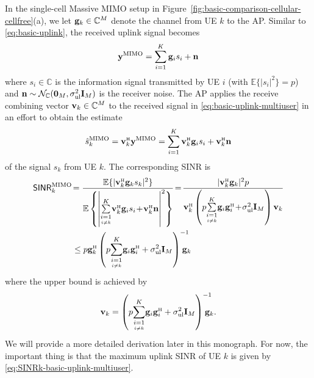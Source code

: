 In the single-cell Massive \gls{MIMO} setup in Figure~\ref{fig:basic-comparison-cellular-cellfree}(a), we let $\mathbf{g}_k \in \mathbb{C}^M$ denote the channel from \gls{UE} $k$ to the \gls{AP}. Similar to \eqref{eq:basic-uplink}, the received uplink signal becomes
\begin{equation} \label{eq:basic-uplink-multiuser}
\mathbf{y}^{\textrm{MIMO}} = \sum_{i=1}^{K} \mathbf{g}_i s_i + \mathbf{n}
\end{equation}
where $s_i \in \mathbb{C}$ is the information signal transmitted by \gls{UE} $i$ (with $\mathbb{E}\{ | s_i|^2 \} = p$) and $\mathbf{n} \sim \mathcal{N}_{\mathbb{C}} ( \mathbf{0}_M, \sigma^2_{\mathrm{ul}} \mathbf{I}_M )$ is the receiver noise. The \gls{AP} applies the receive combining vector $\mathbf{v}_k \in \mathbb{C}^M$ to the received signal in \eqref{eq:basic-uplink-multiuser} in an effort to obtain the estimate 
\begin{equation} \label{eq:s-estimate-MIMO-multiuser}
\hat{s}_k^{\textrm{MIMO}}  = \vect{v}_k^{\Htran} \vect{y}^{\textrm{MIMO}}  =   \sum_{i=1}^{K} \vect{v}_k^{\Htran} \vect{g}_i s_i + \vect{v}_k^{\Htran}\vect{n}
\end{equation}
of the signal $s_k$ from \gls{UE} $k$. The corresponding \gls{SINR} is
\begin{align} \notag
\mathacr{SINR}_k^{\textrm{MIMO}} &\!= \frac{\mathbb{E}\{ | \vect{v}_k^{\Htran} \vect{g}_k s_k  |^2 \}}{ \mathbb{E} \left\{ \left|
\condSum{i=1}{i \neq k}{K} \vect{v}_k^{\Htran} \vect{g}_i s_i \!+\! \vect{v}_k^{\Htran}\vect{n}
\right|^2 \right\} } \!=\! \frac{| \vect{v}_k^{\Htran} \vect{g}_k|^2 p }{\vect{v}_k^{\Htran} \left( p  \condSum{i=1}{i \neq k}{K} \vect{g}_i \vect{g}_i^{\Htran} \!+\! \sigmaUL \vect{I}_M  \right) \vect{v}_k} \\
&\leq p \vect{g}_k^{\Htran} \left( p  \condSum{i=1}{i \neq k}{K} \vect{g}_i \vect{g}_i^{\Htran} + \sigmaUL \vect{I}_M  \right)^{-1}\!\!\!\!\!\! \vect{g}_k \label{eq:SINRk-basic-uplink-multiuser}
\end{align}
where the upper bound is achieved by  \cite[Lemma B.10]{massivemimobook}
\begin{align}
\vect{v}_k = \left(  p  \condSum{i=1}{i \neq k}{K} \vect{g}_i \vect{g}_i^{\Htran} + \sigmaUL \vect{I}_M  \right)^{-1} \!\!\!\!\!\!\vect{g}_k.
\end{align}
We will provide a more detailed derivation later in this monograph. For now, the important thing is that the maximum uplink \gls{SINR} of \gls{UE} $k$ is given by \eqref{eq:SINRk-basic-uplink-multiuser}.

\enlargethispage{\baselineskip} 

